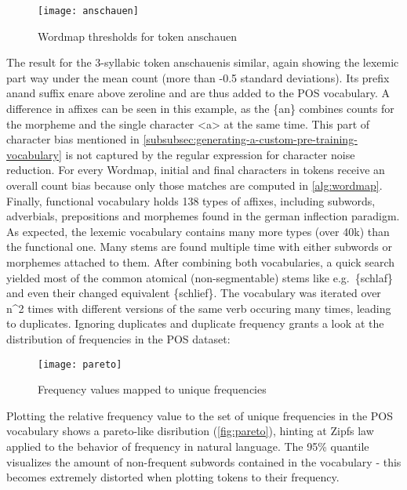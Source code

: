 \begin{figure}[H]
    \centering
    \texttt{[image: anschauen]}
    \caption[Wordmap for \textquotesingle anschauen\textquotesingle]{Wordmap thresholds for token \textquotesingle anschauen\textquotesingle}
    \label{fig:wordmap3}
\end{figure}

The result for the 3-syllabic token \textquotesingle anschauen\textquotesingle is similar, again showing the lexemic part way under the mean count (more than -0.5 standard deviations).
Its prefix \textquotesingle an\textquotesingle and suffix \textquotesingle en\textquotesingle are above zeroline and are thus added to the POS vocabulary.
A difference in affixes can be seen in this example, as the \{an\} combines counts for the morpheme and the single character <a> at the same time.
This part of character bias mentioned in \autoref{subsubsec:generating-a-custom-pre-training-vocabulary} is not captured by the regular expression for character noise reduction.
For every Wordmap, initial and final characters in tokens receive an overall count bias because only those matches are computed in \autoref{alg:wordmap}.
Finally, functional vocabulary holds 138 types of affixes, including subwords, adverbials, prepositions and morphemes found in the german inflection paradigm.
As expected, the lexemic vocabulary contains many more types (over 40k) than the functional one.
Many stems are found multiple time with either subwords or morphemes attached to them.
After combining both vocabularies, a quick search yielded most of the common atomical (non-segmentable) stems like e.g.\ \{schlaf\} and even their changed equivalent \{schlief\}.
The vocabulary was iterated over n^{2} times with different versions of the same verb occuring many times, leading to duplicates.
Ignoring duplicates and duplicate frequency grants a look at the distribution of frequencies in the POS dataset:

\begin{figure}[H]
    \centering
    \texttt{[image: pareto]}
    \caption[Pareto distribution in POS vocabulary]{Frequency values mapped to unique frequencies}
    \label{fig:pareto}
\end{figure}

Plotting the relative frequency value to the set of unique frequencies in the POS vocabulary shows a pareto-like disribution (\autoref{fig:pareto}), hinting at Zipf\textquotesingle s law applied to the behavior of frequency in natural language.
The 95\% quantile visualizes the amount of non-frequent subwords contained in the vocabulary - this becomes extremely distorted when plotting tokens to their frequency.

